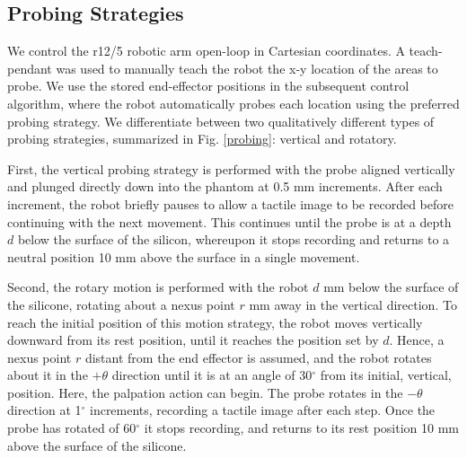 \documentclass[]{interact}
\theoremstyle{plain}%
\theoremstyle{definition}
\theoremstyle{remark}
\newcommand{\degree}{$^{\circ}$ }
\begin{document}



\subsection{Probing Strategies} \label{sec_motor_interactions}

We control the r12/5 robotic arm open-loop in Cartesian coordinates. A teach-pendant was used to manually teach the 
robot the x-y location of the areas to probe. We use the stored end-effector positions in the subsequent 
control algorithm, where the robot automatically probes each location using the preferred probing strategy. 
We differentiate between two qualitatively different types of probing strategies, summarized in 
Fig. \ref{probing}: vertical and rotatory. 

First, the vertical probing strategy is performed with the probe aligned vertically and plunged 
directly down into the phantom at 0.5 mm increments. After each increment, the robot briefly pauses to allow a 
tactile image to be recorded before continuing with the next movement. This continues until the probe is at a 
depth $d$ below the surface of the silicon, whereupon it stops recording and returns to a neutral position 10 mm 
above the surface in a single movement.

Second, the rotary motion is performed with the robot $d$ mm below the surface of the silicone, rotating about 
a nexus point $r$ mm away in the vertical direction. To reach the initial position of this motion strategy, 
the robot moves vertically downward from its rest position, until it reaches the position set by $d$. Hence, a 
nexus point $r$ distant from the end effector is assumed, and the robot rotates about it in the $+\theta$ 
direction until it is at an angle of 30\degree from its initial, vertical, position. Here, the palpation action can 
begin. The probe rotates in the $-\theta$ direction at 1\degree increments, recording a tactile image after each step. 
Once the probe has rotated of 60\degree it stops recording, and returns to its rest position 10 mm above the 
surface of the silicone. 
\end{document}
